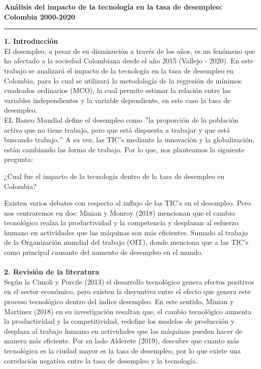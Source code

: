 \begin{center}
    \textbf{\Large Análisis del impacto de la tecnología en la tasa de desempleo:\\Colombia 2000-2020}
\end{center}
\begin{center}
	\rule{1\textwidth}{0.5pt}
\end{center}
\vspace{1.5cm}


\textbf{\large 1. Introducción}\\

El desempleo, a pesar de su disminución a través de los años, es un fenómeno que ha afectado a la sociedad Colombiana desde el año 2015 (Vallejo - 2020). En este trabajo se analizará el impacto de la tecnología en la tasa de desempleo en Colombia, para lo cual se utilizará la metodología de la regresión de mínimos cuadrados ordinarios (MCO), la cual permite estimar la relación entre las variables independientes y la variable dependiente, en este caso la tasa de desempleo.\\

EL Banco Mundial define el desempleo como $"$la proporción de la población activa que no tiene trabajo, pero que está dispuesta a trabajar y que está buscando trabajo.$"$ A su vez, las TIC's mediante la innovación y la globalización, están cambiando las forma de trabajo. Por lo que, nos planteamos la siguiente pregunta:

\begin{center}
    ¿Cual fue el impacto de la tecnología dentro de la tasa de desempleo en Colombia?
\end{center}

Existen varios debates con respecto al influjo de las TIC's en el desempleo. Pero nos centraremos en dos: Minian y Monroy (2018) mencionan que el cambio tecnológico realza la productividad y la competencia y desplazan al esfuerzo humano en actividades que las máquinas son más eficientes. Sumado al trabajo de la Organización mundial del trabajo (OIT), donde menciona que a las TIC's como principal causante del aumento de desempleo en el mundo.\\\\


\textbf{\large 2. Revisión de la literatura}\\

Según la Cimoli y Porcile (2013) el desarrollo tecnológico genera efectos positivos en el sector económico, pero existen la disyuntiva entre el efecto que genera este proceso tecnológico dentro del índice desempleo. En este sentido, Minian y Martinez (2018) en su investigación resaltan que, el cambio tecnológico aumenta la productividad y la competitividad, redefine los modelos de producción y desplaza al trabajo humano en actividades que las máquinas pueden hacer de manera más eficiente. Por su lado Alderete (2019), descubre que cuanto más tecnológica es la ciudad mayor es la tasa de desempleo, por lo que existe una correlación negativa entre la tasa de desempleo y la tecnología. \\

